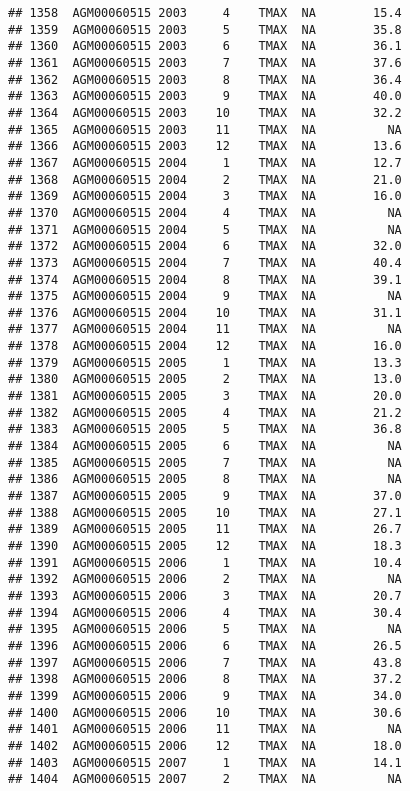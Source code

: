 \documentclass{article}\usepackage[]{graphicx}\usepackage[]{color}
\makeatletter
\newenvironment{kframe}{%
 \def\at@end@of@kframe{}%
 \ifinner\ifhmode%
  \def\at@end@of@kframe{\end{minipage}}%
  \begin{minipage}{\columnwidth}%
 \fi\fi%
 \def\FrameCommand##1{\hskip\@totalleftmargin \hskip-\fboxsep
 \colorbox{shadecolor}{##1}\hskip-\fboxsep
     \hskip-\linewidth \hskip-\@totalleftmargin \hskip\columnwidth}%
 \MakeFramed {\advance\hsize-\width
   \@totalleftmargin\z@ \linewidth\hsize
   \@setminipage}}%
 {\par\unskip\endMakeFramed%
 \at@end@of@kframe}
\newenvironment{knitrout}{}{} %
\makeatother
\begin{document}
\begin{knitrout}
\begin{kframe}
\begin{verbatim}
## 1358  AGM00060515 2003     4    TMAX  NA        15.4
## 1359  AGM00060515 2003     5    TMAX  NA        35.8
## 1360  AGM00060515 2003     6    TMAX  NA        36.1
## 1361  AGM00060515 2003     7    TMAX  NA        37.6
## 1362  AGM00060515 2003     8    TMAX  NA        36.4
## 1363  AGM00060515 2003     9    TMAX  NA        40.0
## 1364  AGM00060515 2003    10    TMAX  NA        32.2
## 1365  AGM00060515 2003    11    TMAX  NA          NA
## 1366  AGM00060515 2003    12    TMAX  NA        13.6
## 1367  AGM00060515 2004     1    TMAX  NA        12.7
## 1368  AGM00060515 2004     2    TMAX  NA        21.0
## 1369  AGM00060515 2004     3    TMAX  NA        16.0
## 1370  AGM00060515 2004     4    TMAX  NA          NA
## 1371  AGM00060515 2004     5    TMAX  NA          NA
## 1372  AGM00060515 2004     6    TMAX  NA        32.0
## 1373  AGM00060515 2004     7    TMAX  NA        40.4
## 1374  AGM00060515 2004     8    TMAX  NA        39.1
## 1375  AGM00060515 2004     9    TMAX  NA          NA
## 1376  AGM00060515 2004    10    TMAX  NA        31.1
## 1377  AGM00060515 2004    11    TMAX  NA          NA
## 1378  AGM00060515 2004    12    TMAX  NA        16.0
## 1379  AGM00060515 2005     1    TMAX  NA        13.3
## 1380  AGM00060515 2005     2    TMAX  NA        13.0
## 1381  AGM00060515 2005     3    TMAX  NA        20.0
## 1382  AGM00060515 2005     4    TMAX  NA        21.2
## 1383  AGM00060515 2005     5    TMAX  NA        36.8
## 1384  AGM00060515 2005     6    TMAX  NA          NA
## 1385  AGM00060515 2005     7    TMAX  NA          NA
## 1386  AGM00060515 2005     8    TMAX  NA          NA
## 1387  AGM00060515 2005     9    TMAX  NA        37.0
## 1388  AGM00060515 2005    10    TMAX  NA        27.1
## 1389  AGM00060515 2005    11    TMAX  NA        26.7
## 1390  AGM00060515 2005    12    TMAX  NA        18.3
## 1391  AGM00060515 2006     1    TMAX  NA        10.4
## 1392  AGM00060515 2006     2    TMAX  NA          NA
## 1393  AGM00060515 2006     3    TMAX  NA        20.7
## 1394  AGM00060515 2006     4    TMAX  NA        30.4
## 1395  AGM00060515 2006     5    TMAX  NA          NA
## 1396  AGM00060515 2006     6    TMAX  NA        26.5
## 1397  AGM00060515 2006     7    TMAX  NA        43.8
## 1398  AGM00060515 2006     8    TMAX  NA        37.2
## 1399  AGM00060515 2006     9    TMAX  NA        34.0
## 1400  AGM00060515 2006    10    TMAX  NA        30.6
## 1401  AGM00060515 2006    11    TMAX  NA          NA
## 1402  AGM00060515 2006    12    TMAX  NA        18.0
## 1403  AGM00060515 2007     1    TMAX  NA        14.1
## 1404  AGM00060515 2007     2    TMAX  NA          NA

\end{verbatim}
\end{kframe}
\end{knitrout}
\end{document}
